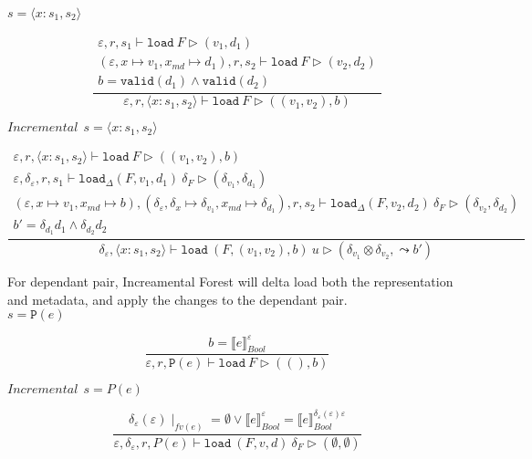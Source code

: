 \documentclass[10pt,twoside,a4paper]{article}
\theoremstyle{theorem}
\theoremstyle{lemma}
\theoremstyle{property}
\theoremstyle{definition}
\theoremstyle{assumption}
\begin{document}
$\boxed{s = \langle x : s_1, s_2 \rangle}$

\begin{displaymath}
	\frac{\begin{array}{c}
		\varepsilon, r, s_1 \vdash \mathtt{load}~F \rhd (v_1,d_1)\\
		(\varepsilon, x \mapsto v_1, x_{md} \mapsto d_1), r, s_2 \vdash \mathtt{load}~F \rhd (v_2,d_2)\\
		b = \mathtt{valid}(d_1) \land \mathtt{valid}(d_2)
	\end{array}}
	{\varepsilon, r, \langle x : s_1, s_2 \rangle \vdash \mathtt{load}~F \rhd ((v_1, v_2),b) }
\end{displaymath}

$\boxed{Incremental~~s = \langle x : s_1, s_2 \rangle}$

\begin{displaymath}
	\frac{\begin{array}{c}
		\varepsilon, r, \langle x : s_1, s_2 \rangle \vdash \mathtt{load}~F \rhd ((v_1, v_2),b)\\
		\varepsilon, \delta_\varepsilon, r, s_1 \vdash \mathtt{load}_\Delta (F,v_1,d_1)~ \delta_F \rhd (\delta_{v_1},\delta_{d_1})\\
		(\varepsilon, x \mapsto v_1, x_{md} \mapsto b), (\delta_\varepsilon, \delta_x \mapsto \delta_{v_1}, x_{md} \mapsto \delta_{d_1}), r, s_2 \vdash \mathtt{load}_\Delta (F,v_2,d_2)~ \delta_F \rhd (\delta_{v_2},\delta_{d_2})\\
		b' = \delta_{d_1} d_1 \land \delta_{d_2} d_2
	\end{array}}
	{\delta_\varepsilon, \langle x:s_1,s_2 \rangle \vdash \mathtt{load}~ (F,(v_1,v_2),b)~ u \rhd (\delta_{v_1} \otimes \delta_{v_2}, \leadsto b') }
\end{displaymath}

For dependant pair, Increamental Forest will delta load both the representation and metadata, and apply the changes to the dependant pair.\\

$\boxed{s = \mathtt{P}(e)}$

\begin{displaymath}
	\frac
	{b = \llbracket e \rrbracket^{\varepsilon}_{Bool}}
	{\varepsilon, r, \mathtt{P}(e) \vdash \mathtt{load}~F \rhd ((),b)}
\end{displaymath}

$\boxed{Incremental~~s = P(e)}$

\begin{displaymath}
	\frac{ \delta_\varepsilon(\varepsilon) \mid_{fv(e)} = \emptyset \lor \llbracket e \rrbracket^{\varepsilon}_{Bool} = \llbracket e \rrbracket^{\delta_\varepsilon(\varepsilon) \varepsilon}_{Bool}}
	{\varepsilon, \delta_\varepsilon, r, P(e) \vdash \mathtt{load}~ (F,v,d) ~\delta_F \rhd (\emptyset, \emptyset)}
\end{displaymath}
\end{document}
